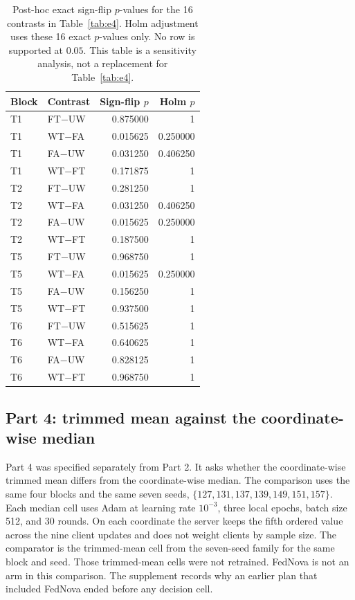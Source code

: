 \documentclass{ieeeaccess}
\begin{document}
\begin{table}[!t]
\centering
\caption{Post-hoc exact sign-flip $p$-values for the 16 contrasts in Table~\ref{tab:e4}. Holm adjustment uses these 16 exact $p$-values only. No row is supported at $0.05$. This table is a sensitivity analysis, not a replacement for Table~\ref{tab:e4}.}
\label{tab:signflip}
\scriptsize
\begin{tabular}{llrr}
\hline
Block & Contrast & Sign-flip $p$ & Holm $p$ \\
\hline
T1 & FT$-$UW & 0.875000 & 1 \\
T1 & WT$-$FA & 0.015625 & 0.250000 \\
T1 & FA$-$UW & 0.031250 & 0.406250 \\
T1 & WT$-$FT & 0.171875 & 1 \\
T2 & FT$-$UW & 0.281250 & 1 \\
T2 & WT$-$FA & 0.031250 & 0.406250 \\
T2 & FA$-$UW & 0.015625 & 0.250000 \\
T2 & WT$-$FT & 0.187500 & 1 \\
T5 & FT$-$UW & 0.968750 & 1 \\
T5 & WT$-$FA & 0.015625 & 0.250000 \\
T5 & FA$-$UW & 0.156250 & 1 \\
T5 & WT$-$FT & 0.937500 & 1 \\
T6 & FT$-$UW & 0.515625 & 1 \\
T6 & WT$-$FA & 0.640625 & 1 \\
T6 & FA$-$UW & 0.828125 & 1 \\
T6 & WT$-$FT & 0.968750 & 1 \\
\hline
\end{tabular}
\end{table}

\subsection{Part 4: trimmed mean against the coordinate-wise median}
\label{sec:e5}
Part 4 was specified separately from Part 2. It asks whether the coordinate-wise trimmed mean differs from the coordinate-wise median. The comparison uses the same four blocks and the same seven seeds, $\{127,131,137,139,149,151,157\}$. Each median cell uses Adam at learning rate $10^{-3}$, three local epochs, batch size 512, and 30 rounds. On each coordinate the server keeps the fifth ordered value across the nine client updates and does not weight clients by sample size. The comparator is the trimmed-mean cell from the seven-seed family for the same block and seed. Those trimmed-mean cells were not retrained. FedNova is not an arm in this comparison. The supplement records why an earlier plan that included FedNova ended before any decision cell.
\end{document}
